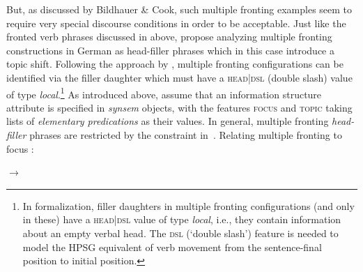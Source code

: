 \documentclass[output=paper]{langsci/langscibook}
\begin{document}
But, as discussed by Bildhauer \& Cook, such multiple fronting
examples seem to require very special discourse conditions in order to
be acceptable. Just like the fronted verb phrases discussed in
\cite{dKM2003a} above, \cite{BC2010a} propose
analyzing multiple fronting constructions in German as head-filler
phrases which in this case introduce a topic shift. Following the
approach by \cite{Mueller2005d-unlinked}, multiple fronting
configurations can be identified via the filler daughter which must
have a \textsc{head|dsl} (double slash) value of type
\textit{local}.\footnote{In  formalization, filler daughters in multiple fronting configurations (and only in these) have a  \textsc{head|dsl} value of type \textit{local}, i.e., they contain information about an empty verbal head. The \textsc{dsl} (‘double slash’) feature is needed to model the HPSG equivalent of verb movement from the sentence-final position to initial position. } As introduced above, \cite{BC2010a} assume that an
information structure attribute is specified in \textit{synsem}
objects, with the features \textsc{focus} and \textsc{topic} taking
lists of \textit{elementary predications} as their values. In general,
multiple fronting \textit{head-filler} phrases are restricted by the
constraint in~.
\ea
Relating multiple fronting to focus \citep[75]{BC2010a}:\\
  \centering
    \begin{avm}
    \end{avm}
$\to$\ 
  \begin{avm}
  \end{avm}
\end{document}
